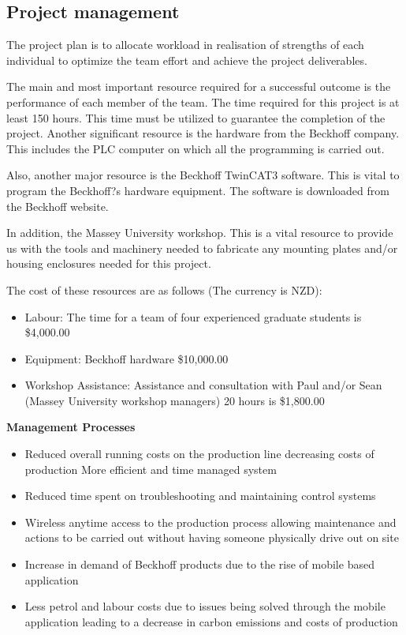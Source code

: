 \documentclass[a4paper, 10pt, conference]{IEEEconf}
\begin{document}
\subsection{Project management}

The project plan is to allocate workload in realisation of strengths of each individual to optimize the team effort and achieve the project deliverables. 

The main and most important resource required for a successful outcome is the performance of each member of the team. The time required for this project is at least 150 hours. This time must be utilized to guarantee the completion of the project.
Another significant resource is the hardware from the Beckhoff company. This includes the PLC computer on which all the programming is carried out.

Also, another major resource is the Beckhoff TwinCAT3 software. This is vital to program the Beckhoff?s hardware equipment. The software is downloaded from the Beckhoff website.

In addition, the Massey University workshop. This is a vital resource to provide us with the tools and machinery needed to fabricate any mounting plates and/or housing enclosures needed for this project.

The cost of these resources are as follows (The currency is NZD):
\begin{itemize}
	\item Labour: The time for a team of four experienced graduate students is \$4,000.00
	\item Equipment: Beckhoff hardware \$10,000.00
	\item Workshop Assistance: Assistance and consultation with Paul and/or Sean (Massey University workshop managers) 20 hours is \$1,800.00
\end{itemize}	

{\bf Management Processes}

\begin{itemize}
	\item Reduced overall running costs on the production line decreasing costs of production
More efficient and time managed system
	\item Reduced time spent on troubleshooting and maintaining control systems
	\item Wireless anytime access to the production process allowing maintenance and actions to be carried out without having someone physically drive out on site
	\item Increase in demand of Beckhoff products due to the rise of mobile based application
	\item Less petrol and labour costs due to issues being solved through the mobile application leading to a decrease in carbon emissions and costs of production
\end{itemize}	
\end{document}
